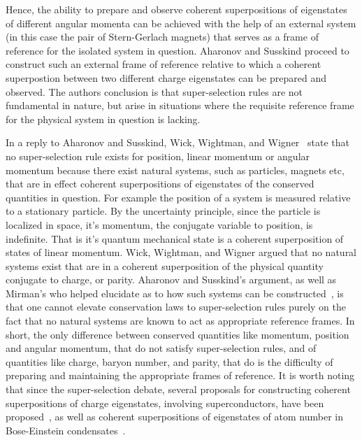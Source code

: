 \documentclass{article}
\begin{document}
Hence, the ability to prepare and observe coherent superpositions of eigenstates of different angular momenta can be achieved with the help of an external system (in this case the pair of Stern-Gerlach magnets) that serves as a frame of reference for the isolated system in question.  Aharonov and Susskind proceed to construct such an external frame of reference relative to which a coherent superpostion between two different charge eigenstates can be prepared and observed.  The authors conclusion is that super-selection rules are not fundamental in nature, but arise in situations where the  requisite reference frame for the physical system in question is lacking.
   

In a reply to Aharonov and Susskind, Wick, Wightman, and Wigner~\cite{WWW70} state that no super-selection rule exists for position, linear momentum or angular momentum because there exist natural systems, such as particles, magnets etc, that are in effect coherent superpositions of eigenstates of the conserved quantities in question. For example the position of a system is measured relative to a stationary particle.  By the uncertainty principle, since the particle is localized in space, it's momentum, the conjugate variable to position, is indefinite.  That is it's quantum mechanical state is a coherent superposition of states of linear momentum.  Wick, Wightman, and Wigner argued that no natural systems exist that are in a coherent superposition of the physical quantity conjugate to charge, or parity.  Aharonov and Susskind's argument, as well as Mirman's who helped elucidate as to how such systems can be constructed~\cite{M69, M79}, is that one cannot elevate conservation laws to super-selection rules purely on the fact that no natural systems are known to act as appropriate reference frames.  In short, the only difference between conserved quantities like momentum, position and angular momentum, that do not satisfy super-selection rules, and of quantities like charge, baryon number, and parity, that do is the difficulty of preparing and maintaining the appropriate frames of reference.  It is worth noting that since the super-selection debate, several proposals for constructing coherent superpositions of charge eigenstates, involving superconductors, have been proposed~\cite{KW74}, as well as coherent superpositions of eigenstates of atom number in Bose-Einstein condensates~\cite{CD97, HY96,JY96,YRJ97,DBRS06}.
\end{document}
